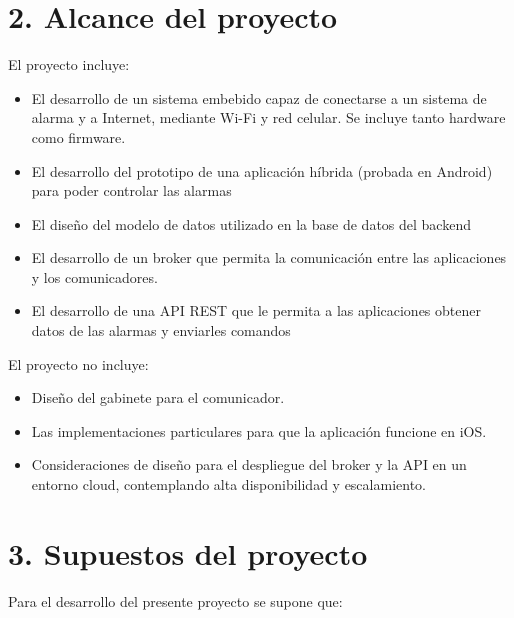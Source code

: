 \documentclass[
11pt, %
codirector, %
]{charter}
\begin{document}
\section{2. Alcance del proyecto}
\label{sec:alcance}


El proyecto incluye:

\begin{itemize}
	\item El desarrollo de un sistema embebido capaz de conectarse a un sistema de alarma y a Internet, mediante Wi-Fi y red celular. Se incluye tanto hardware como firmware.
	\item El desarrollo del prototipo de una aplicación híbrida (probada en Android) para poder controlar las alarmas
	\item El diseño del modelo de datos utilizado en la base de datos del backend
	\item El desarrollo de un broker que permita la comunicación entre las aplicaciones y los comunicadores.
	\item El desarrollo de una API REST que le permita a las aplicaciones obtener datos de las alarmas y enviarles comandos
\end{itemize}

El proyecto no incluye:

\begin{itemize}
	\item Diseño del gabinete para el comunicador.
	\item Las implementaciones particulares para que la aplicación funcione en iOS.
	\item Consideraciones de diseño para el despliegue del broker y la API en un entorno cloud, contemplando alta disponibilidad y escalamiento.
\end{itemize}



\section{3. Supuestos del proyecto}
\label{sec:supuestos}

Para el desarrollo del presente proyecto se supone que:
\end{document}

